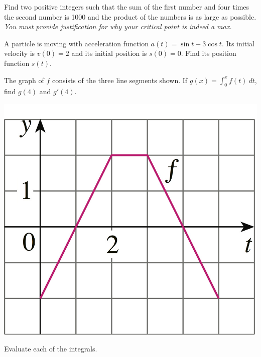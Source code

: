 \documentclass[12pt, addpoints]{exam/exam}
\newcommand{\1}{^{-1}}
\theoremstyle{plain}
\begin{document}
\begin{questions}

\question[3]%
Find two positive integers such that the sum of the first number and four times the second number is 1000 and the product of the numbers is as large as possible. 	\textit{You must provide justification for why your critical point is indeed a max.}
\vspace{10pc}

\newpage
\question[3]%
A particle is moving with acceleration function $a(t)=\sin t+3\cos t$.  Its initial velocity is $v(0)=2$ and its initial position is $s(0)=0$.  Find its position function $s(t)$.
\vspace{12pc}

\question[2]%
The graph of $f$ consists of the three line segments shown.  If $g(x)=\int_0^xf(t)\ dt$, find $g(4)$ and $g'(4)$.
\begin{center}
\includegraphics[scale=4]{5Rev_9Stewart8Ed.jpg}
\end{center}

\question Evaluate each of the integrals.
	\begin{parts}

\end{parts}
\end{questions}
\end{document}
